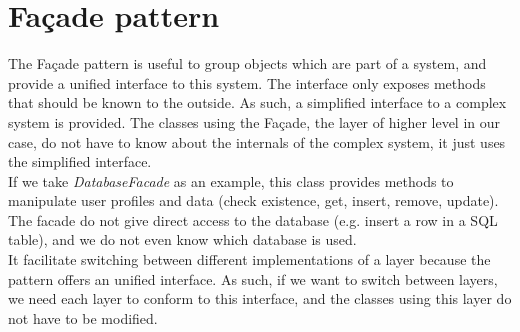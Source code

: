 \section{Façade pattern}
The Façade pattern is useful to group objects which are part of a system, and
provide a unified interface to this system. The interface only exposes methods
that should be known to the outside. As such, a simplified interface to a
complex system is provided. The classes using the Façade, the layer of higher
level in our case, do not have to know about the internals of the complex
system, it just uses the simplified interface.\\

If we take \emph{DatabaseFacade} as an example, this class provides methods
to manipulate user profiles and data (check existence, get, insert, remove,
update). The facade do not give direct access to the database
(e.g. insert a row in a SQL table), and we do not even know which database is
used.\\

It facilitate switching between different implementations of a layer because the
pattern offers an unified interface. As such, if we want to switch between
layers, we need each layer to conform to this interface, and the classes using
this layer do not have to be modified.

\newpage
